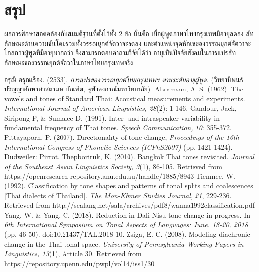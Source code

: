 \documentclass[a4paper]{article}
\begin{document}
\section{สรุป}
    ผลการศึกษาสอดคล้องกับสมมติฐานที่ตั้งไว้ทั้ง 2 ข้อ นั่นคือ เมื่อผู้พูดภาษาไทยกรุงเทพมีอายุลดลง สัทลักษณะด้านความชันโดยรวมทั้งวรรณยุกต์จัตวาจะลดลง และตำแหน่งจุดหักเหของวรรณยุกต์จัตวาจะไกลกว่าผู้พูดที่มีอายุมากกว่า จึงสามารถตอบคำถามวิจัยได้ว่า อายุเป็นปัจจัยสังคมในการแปรสัทลักษณะของวรรณยุกต์จัตวาในภาษาไทยกรุงเทพจริง
\begin{thebibliography}{9}
     อรุณี อรุณเรือง. (2533). \textit{การแปรของวรรณยุกต์ไทยกรุงเทพฯ ตามระดับอายุผู้พูด.} (วิทยานิพนธ์ปริญญาอักษรศาสตรมหาบัณฑิต, จุฬาลงกรณ์มหาวิทยาลัย).
     Abramson, A. S. (1962). The vowels and tones of Standard Thai: Acoustical measurements and experiments. \textit{International Journal of American Linguistics, 28}(2): 1-146.
     Gandour, Jack, Siripong P, \& Sumalee D. (1991). Inter- and intraspeaker variability in fundamental frequency of Thai tones. \textit{Speech Communication, 10}: 355-372.
     Pittayaporn, P. (2007). Directionality of tone change, \textit{Proceedings of the 16th International Congress of Phonetic Sciences (ICPhS2007)} (pp. 1421-1424). Dudweiler: Pirrot.
     Thepboriruk, K. (2010). Bangkok Thai tones revisited. \textit{Journal of the Southeast Asian Linguistics Society, 3}(1), 86-105. Retrieved from https://openresearch-repository.anu.edu.au/handle/1885/8943
     Tienmee, W. (1992). Classification by tone shapes and patterns of tonal splits and coalescences [Thai dialects of Thailand]. \textit{The Mon-Khmer Studies Journal, 21}, 229-236. Retrieved from http://sealang.net/sala/archives/pdf8/wanna1992classification.pdf
     Yang, W. \& Yang, C. (2018). Reduction in Dali Nisu tone change-in-progress. In \textit{6th International Symposium on Tonal Aspects of Languages: June. 18-20, 2018} (pp. 46-50). doi:10.21437/TAL.2018-10.
     Zsiga, E. C. (2008). Modeling diachronic change in the Thai tonal space. \textit{University of Pennsylvania Working Papers in Linguistics, 13}(1), Article 30. Retrieved from https://repository.upenn.edu/pwpl/vol14/iss1/30
\end{thebibliography}
\end{document}
